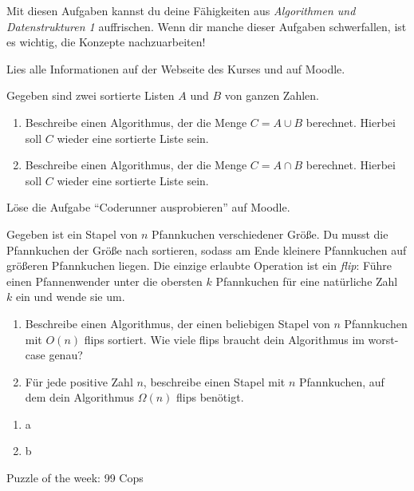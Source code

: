\documentclass{uebung_cs}
\begin{document}
Mit diesen Aufgaben kannst du deine Fähigkeiten aus \emph{Algorithmen und Datenstrukturen 1} auffrischen. Wenn dir manche dieser Aufgaben schwerfallen, ist es wichtig, die Konzepte nachzuarbeiten!

\begin{aufgabe}[Orga]
    Lies alle Informationen auf der Webseite des Kurses und auf Moodle.
\end{aufgabe}

\begin{aufgabe}
    Gegeben sind zwei sortierte Listen $A$ und $B$ von ganzen Zahlen.
    \begin{enumerate}
        \item Beschreibe einen Algorithmus, der die Menge $C=A\cup B$ berechnet. Hierbei soll $C$ wieder eine sortierte Liste sein.
        \item Beschreibe einen Algorithmus, der die Menge $C=A\cap B$ berechnet. Hierbei soll $C$ wieder eine sortierte Liste sein.
    \end{enumerate}
\end{aufgabe}

\begin{aufgabe}[Coderunner]
    Löse die Aufgabe \enquote{Coderunner ausprobieren} auf Moodle.
\end{aufgabe}

\begin{aufgabe}[Pfannkuchensortierung]
    Gegeben ist ein Stapel von $n$ Pfannkuchen verschiedener Größe.
    Du musst die Pfannkuchen der Größe nach sortieren, sodass am Ende kleinere Pfannkuchen auf größeren Pfannkuchen liegen.
    Die einzige erlaubte Operation ist ein \emph{flip}: Führe einen Pfannenwender unter die obersten $k$ Pfannkuchen für eine natürliche Zahl~$k$ ein und wende sie um.
    \begin{enumerate}
        \item Beschreibe einen Algorithmus, der einen beliebigen Stapel von $n$ Pfannkuchen mit $O(n)$ flips sortiert. Wie viele flips braucht dein Algorithmus im worst-case genau?
        \item Für jede positive Zahl $n$, beschreibe einen Stapel mit $n$ Pfannkuchen, auf dem dein Algorithmus $\Omega(n)$ flips benötigt.
    \end{enumerate}
\end{aufgabe}

\begin{aufgabe}[Netzwerke]
    [to-do]
    \begin{enumerate}
        \item a
        \item b
    \end{enumerate}
\end{aufgabe}

Puzzle of the week: 99 Cops
\end{document}
